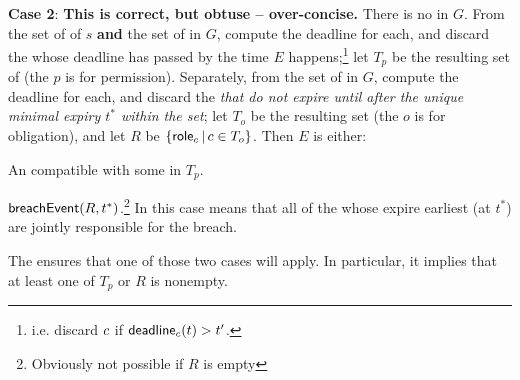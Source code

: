 \documentclass[12pt]{article}
\begin{document}
{\bf Case 2}: {\bf This is correct, but obtuse -- over-concise.} There is no \enabled \mustntran in $G$. From the set of \enabled \mayntrans of $s$ {\bf and} the set of \enabled \rmustntrans in $G$, compute the deadline for each, and discard the \connections whose deadline has passed by the time $E$ happens;\footnote{i.e. discard $c$ if $\textsf{deadline}_{c}(t) > t'$.}  let $T_p$ be the resulting set of \connections (the $p$ is for permission). Separately, from the set of \enabled \rmustntrans in $G$, compute the deadline for each, and discard the {\connections} {\it that do not expire until after the unique minimal expiry \TimeStamp $t^*$ within the set}; let $T_o$ be the resulting set (the $o$ is for obligation), and let $R$ be $\{ \textsf{role}_{c} \, \vert \, c \in T_{o} \}$. Then $E$ is either:
\begin{PPI}
	\item An \Event compatible with some \connection in $T_p$.
	\item $\textsf{breachEvent}(R,t^*)$.\footnote{Obviously not possible if $R$ is empty} In this case means that all of the \Roles whose \enabled \rmustntran expire earliest (at $t^*$) are jointly responsible for the breach.
\end{PPI}
The \bostgc ensures that one of those two cases will apply. In particular, it implies that at least one of $T_p$ or $R$ is nonempty.

\end{document}

